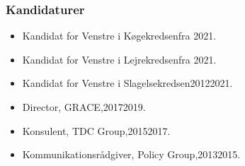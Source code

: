 \documentclass[11pt, a4paper]{awesome-cv}
\begin{document}
\begin{cvletter}
\subsubsection*{Kandidaturer}
\begin{itemize}
\item Kandidat for Venstre i Køgekredsenfra 2021.
\item Kandidat for Venstre i Lejrekredsenfra 2021.
\item Kandidat for Venstre i Slagelsekredsen20122021.
\end{itemize}
\begin{itemize}
\item Director, GRACE,20172019.
\item Konsulent, TDC Group,20152017.
\item Kommunikationsrådgiver, Policy Group,20132015.
\end{itemize}
\end{cvletter}
\end{document}

